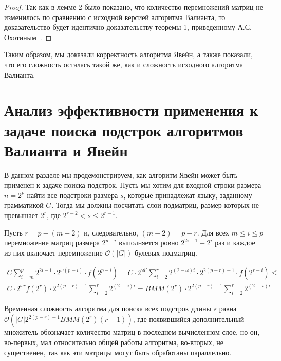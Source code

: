 \documentclass[14pt]{matmex-diploma-custom}
\begin{document}
\begin{proof}
Так как в лемме 2 было показано, что количество перемножений матриц не изменилось по сравнению с исходной версией алгоритма Валианта, то доказательство будет идентично доказательству теоремы 1, приведенному А.С. Охотиным~\cite{Okhotin:2014:PMM:2565359.2565379}.
\end{proof}

Таким образом, мы доказали корректность алгоритма Явейн, а также показали, что его сложность осталась такой же, как и сложность исходного алгоритма Валианта.


\section{Анализ эффективности применения к задаче поиска подстрок алгоритмов Валианта и Явейн}

В данном разделе мы продемонстрируем, как алгоритм Явейн может быть применен к задаче поиска подстрок.
Пусть мы хотим для входной строки размера $n = 2^p$ найти все подстроки размера $s$, которые принадлежат языку, заданному грамматикой $G$.
Тогда мы должны посчитать слои подматриц, размер которых не превышает $2^{r}$, где $2^{r - 2} < s \le 2^{r - 1}$.

Пусть $r = p - (m - 2)$ и, следовательно, $(m - 2) = p - r$.
Для всех  $m \le i \le p$ перемножение матриц размера $2^{p - i}$ выполняется ровно $2^{2i - 1} - 2^{i}$ раз и каждое из них включает перемножение $\mathcal{O}(|G|)$ булевых подматриц.

\begin{equation*}
\begin{array}{c}
C \sum\limits_{i=m}^p 2^{2i - 1} \cdot 2^{\omega(p - i)} \cdot f(2^{p - i}) =
C \cdot 2^{\omega l'}\sum\limits_{i=2}^{r} 2^{(2 - \omega)i} \cdot 2^{2(p - r) - 1} \cdot f(2^{r - i}) \le \\
C \cdot 2^{\omega r} f(2^{r}) \cdot 2^{2(p - r) - 1} \sum\limits_{i=2}^{r} 2^{(2 - \omega)i} =
BMM(2^{r}) \cdot 2^{2(p - r) - 1} \sum\limits_{i=2}^{r} 2^{(2 - \omega)i}
\end{array}
\end{equation*}

Временная сложность алгоритма для поиска всех подстрок длины $s$ равна $\mathcal{O}(|G|2^{2(p - r) - 1}BMM(2^{r})(r - 1))$, где появившийся дополнительный множитель обозначает количество матриц в последнем вычисленном слое, но он, во-первых, мал относительно общей работы алгоритма, во-вторых, не существенен, так как эти матрицы могут быть обработаны параллельно. 
\end{document}
